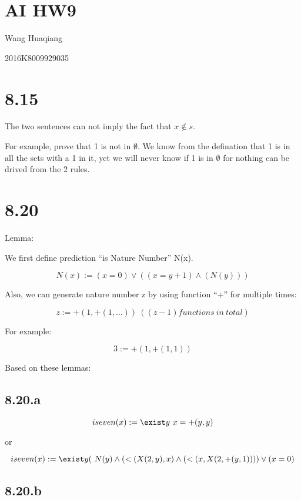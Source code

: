 \hypertarget{ai-hw9}{%
\section{AI HW9}\label{ai-hw9}}

Wang Huaqiang

2016K8009929035

\hypertarget{section}{%
\section{8.15}\label{section}}

The two sentences can not imply the fact that \(x \notin s\).

For example, prove that 1 is not in \(\emptyset\). We know from the
defination that 1 is in all the sets with a 1 in it, yet we will never
know if 1 is in \(\emptyset\) for nothing can be drived from the 2
rules.

\hypertarget{section-1}{%
\section{8.20}\label{section-1}}

Lemma:

We first define prediction ``is Nature Number'' N(x).

\[N(x):=  (x=0)\vee((x=y+1)\wedge(N(y))) \]

Also, we can generate nature number z by using function ``+'' for
multiple times:

\[z := +(1,+(1,...)) \ ((z-1)functions \ in \ total)\]

For example:

\[3:=  +(1,+(1,1)) \]

Based on these lemmas:

\hypertarget{a}{%
\subsection{8.20.a}\label{a}}

\[ iseven(x) := \exist y \ x = +(y,y)\]

or

\[ iseven(x) := \exist y (\ N(y)\wedge (<(X(2,y),x)\wedge (<(x,X(2,+(y,1))))\vee (x=0)\]

\hypertarget{b}{%
\subsection{8.20.b}\label{b}}

